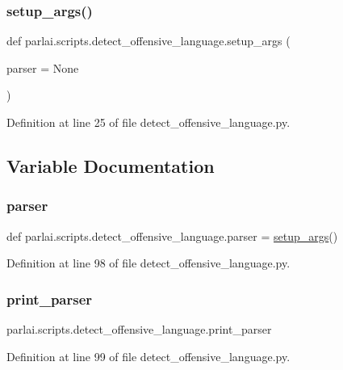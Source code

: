 \subsubsection{\texorpdfstring{setup\+\_\+args()}{setup\_args()}}
{\footnotesize\ttfamily def parlai.\+scripts.\+detect\+\_\+offensive\+\_\+language.\+setup\+\_\+args (\begin{DoxyParamCaption}\item[{}]{parser = {\ttfamily None} }\end{DoxyParamCaption})}



Definition at line 25 of file detect\+\_\+offensive\+\_\+language.\+py.



\subsection{Variable Documentation}
\mbox{\label{namespaceparlai_1_1scripts_1_1detect__offensive__language_a87baca22cf582a78790990b713c5b8ea}} 
\subsubsection{\texorpdfstring{parser}{parser}}
{\footnotesize\ttfamily def parlai.\+scripts.\+detect\+\_\+offensive\+\_\+language.\+parser = \hyperlink{namespaceparlai_1_1scripts_1_1detect__offensive__language_ab3f20447fd2442afdcd45dd77b619378}{setup\+\_\+args}()}



Definition at line 98 of file detect\+\_\+offensive\+\_\+language.\+py.

\mbox{\label{namespaceparlai_1_1scripts_1_1detect__offensive__language_acb74ddd962fd2fc50270c37cdcd65c83}} 
\subsubsection{\texorpdfstring{print\+\_\+parser}{print\_parser}}
{\footnotesize\ttfamily parlai.\+scripts.\+detect\+\_\+offensive\+\_\+language.\+print\+\_\+parser}



Definition at line 99 of file detect\+\_\+offensive\+\_\+language.\+py.

